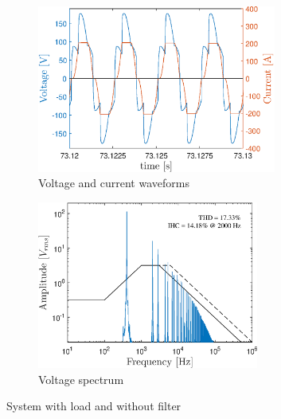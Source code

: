\begin{doublespacing}
\begin{figure}[!htb] %
	\centering
	\begin{subfigure}[b]{0.5\textwidth}
		\centering
		\includegraphics[height=5.5cm]{Figures/artigo_unfilt_3.eps}
		\caption{Voltage and current waveforms} 
		\label{fig:artigo_unfilt_3.eps}
	\end{subfigure}%
	\hfill
	\begin{subfigure}[b]{0.5\textwidth}  
		\centering 
		\includegraphics[height=5.5cm]{Figures/artigo_unfilt_4.eps}
		\caption{Voltage spectrum}    
		\label{fig:artigo_unfilt_4.eps}
	\end{subfigure}%
	\caption{System with load and without filter}
	\label{fig:3}
\end{figure}


\end{doublespacing}
